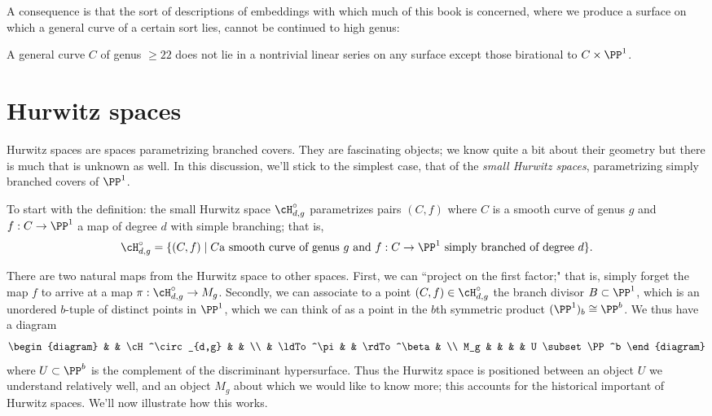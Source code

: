  A consequence is that the sort of descriptions of embeddings with which much of this book is concerned, where we produce a surface on which a general curve of a certain sort lies, cannot be continued to high genus:

\begin{fact}
 A general curve $C$ of  genus $\geq 22$ does not lie in a nontrivial linear series on any surface
 except those birational to $C\times \PP^1$. 
\end{fact}


\section{Hurwitz spaces}\label{Hurwitz spaces}

Hurwitz spaces are spaces parametrizing branched covers. They are fascinating objects; we know quite a bit about their geometry but there is much that is unknown as well. In this discussion, we'll stick to the simplest case, that of the \emph{small Hurwitz spaces}, parametrizing simply branched covers of $\PP^1$.

To start with the definition: the small Hurwitz space $\cH^\circ_{d,g}$ parametrizes pairs $(C, f)$ where $C$ is a smooth curve of genus $g$ and $f : C \to \PP^1$ a map of degree $d$ with simple branching; that is,
$$
\cH^\circ_{d,g} = \{ (C, f) \mid C  \text{a smooth curve of genus $g$ and } f:C \to \PP^1 \text{ simply branched of degree } d\}.
$$

There are two natural maps from the Hurwitz space to other spaces. First, we can ``project on the first factor;" that is, simply forget the map $f$ to arrive at a map $\pi : \cH^\circ_{d,g} \to M_g$. Secondly, we can associate to a point $(C,f) \in \cH^\circ_{d,g}$ the branch divisor $B \subset \PP^1$, which is an unordered $b$-tuple of distinct points in $\PP^1$, which we can think of as a point in the $b$th symmetric product $(\PP^1)_b  \cong \PP^b$. We thus have a diagram
$$
\begin{diagram}
& & \cH^\circ_{d,g} & & \\
& \ldTo^\pi & & \rdTo^\beta & \\
M_g & & & & U \subset \PP^b
\end{diagram}
$$
where $U \subset \PP^b$ is the complement of the discriminant hypersurface. Thus the Hurwitz space is positioned between an object $U$ we understand relatively well, and an object $M_g$ about which we would like to know more; this accounts for the historical important of Hurwitz spaces. We'll now illustrate how this works.

